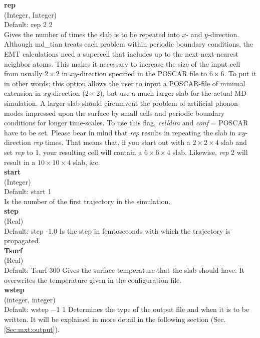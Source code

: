 \documentclass[twoside, 11pt, titlepage, captions=nooneline, a4paper, headsepline]{scrbook}%
\newcommand{\9}{\mathrm}
\newcommand{\0}{\,\mathrm}
\begin{document}
\noindent\textbf{rep}\\ 
(Integer, Integer)\\ 
Default: rep 2 2\\
Gives the number of times the slab is to be repeated into $x$- and $y$-direction. Although md\_tian treats each problem within periodic boundary conditions, the EMT calculations need a supercell that includes up to the next-next-nearest neighbor atoms. This makes it necessary to increase the size of the input cell from usually $2\times2$ in $xy$-direction specified in the POSCAR file to $6\times6$. To put it in other words: this option allows the user to input a POSCAR-file of minimal extension in $xy$-direction ($2\times2$), but use a much larger slab for the actual MD-simulation. A larger slab should circumvent the problem of artificial phonon-modes impressed upon the surface by small cells and periodic boundary conditions for longer time-scales. To use this flag, \textit{celldim} and \textit{conf} = POSCAR have to be set. Please bear in mind that \textit{rep} results in repeating the slab in $xy$-direction \textit{rep} times. That means that, if you start out with a $2\times2\times4$ slab and set \textit{rep} to 1, your resulting cell will contain a $6\times6\times4$ slab. Likewise, \textit{rep} 2 will result in a $10\times10\times4$ slab, \&c.\\  

\noindent\textbf{start}\\ 
(Integer)\\
Default: start 1\\
Is the number of the first trajectory in the simulation.\\

\noindent\textbf{step}\\ 
(Real)\\
Default: step -1.0
Is the step in femtoseconds with which the trajectory is propagated.\\

\noindent\textbf{Tsurf}\\ 
(Real)\\ 
Default: Tsurf 300
Gives the surface temperature that the slab should have. It overwrites the temperature given in the configuration file.\\

\noindent\textbf{wstep}\\
(integer, integer)\\ 
Default: wstep $-1$ 1
Determines the type of the output file and when it is to be written. It will be explained in more detail in the following section (Sec.\,\ref{Sec:mxt:output}).\\
\end{document}
